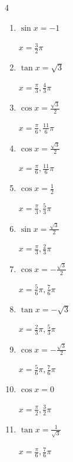 \begin{multicols}{4}
\begin{enumerate}
  \item $\displaystyle \sin{x}  = -1$

        $\displaystyle x = \frac{3}{2}\pi$

  \item $\displaystyle \tan{x}  = \sqrt{3}$

        $\displaystyle x = \frac{\pi}{3} , \frac{4}{3}\pi$

\columnbreak %

\resetques

  \item $\displaystyle \cos{x}  = \frac{\sqrt{3}}{2}$

        $\displaystyle x = \frac{\pi}{6} , \frac{11}{6}\pi$

  \item $\displaystyle \cos{x}  = \frac{\sqrt{3}}{2}$

        $\displaystyle x = \frac{\pi}{6} , \frac{11}{6}\pi$

  \item $\displaystyle \cos{x}  = \frac{1}{2}$

        $\displaystyle x = \frac{\pi}{3} , \frac{5}{3}\pi$

  \item $\displaystyle \sin{x}  = \frac{\sqrt{3}}{2}$

        $\displaystyle x = \frac{\pi}{3} , \frac{2}{3}\pi$

  \item $\displaystyle \cos{x}  = -\frac{\sqrt{3}}{2}$

        $\displaystyle x = \frac{5}{6}\pi , \frac{7}{6}\pi$

  \item $\displaystyle \tan{x}  = -\sqrt{3}$

        $\displaystyle x = \frac{2}{3}\pi , \frac{5}{3}\pi$

  \item $\displaystyle \cos{x}  = -\frac{\sqrt{3}}{2}$

        $\displaystyle x = \frac{5}{6}\pi , \frac{7}{6}\pi$

  \item $\displaystyle \cos{x}  = 0$

        $\displaystyle x = \frac{\pi}{2} , \frac{3}{2}\pi$

  \item $\displaystyle \tan{x}  = \frac{1}{\sqrt{3}}$

        $\displaystyle x = \frac{\pi}{6} , \frac{7}{6}\pi$


\end{enumerate}
\end{multicols}
